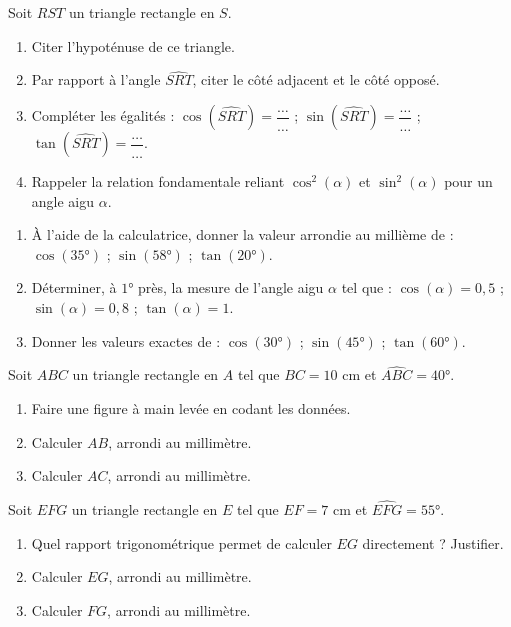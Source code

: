 \documentclass[11pt]{article}
\newcounter{popsec}
\newcounter{popsub}
\newcommand{\courssub}[1]{%
  \stepcounter{popsub}%
  \par\vspace{9pt}\noindent{\popxbold\fontsize{11.5}{13}\selectfont\color{popink}{\color{poporange}\thepopsec.\thepopsub}\hspace{6pt}#1}\par\nopagebreak\vspace{4pt}
}
\begin{document}
\begin{exercice}
Soit $RST$ un triangle rectangle en $S$.
\begin{enumerate}
\item Citer l'hypoténuse de ce triangle.
\item Par rapport à l'angle $\widehat{SRT}$, citer le côté adjacent et le côté opposé.
\item Compléter les égalités : $\cos(\widehat{SRT}) = \dfrac{\ldots}{\ldots}$ ; $\sin(\widehat{SRT}) = \dfrac{\ldots}{\ldots}$ ; $\tan(\widehat{SRT}) = \dfrac{\ldots}{\ldots}$.
\item Rappeler la relation fondamentale reliant $\cos^2(\alpha)$ et $\sin^2(\alpha)$ pour un angle aigu $\alpha$.
\end{enumerate}
\end{exercice}

\begin{exercice}
\begin{enumerate}
\item À l'aide de la calculatrice, donner la valeur arrondie au millième de : $\cos(35°)$ ; $\sin(58°)$ ; $\tan(20°)$.
\item Déterminer, à $1°$ près, la mesure de l'angle aigu $\alpha$ tel que : $\cos(\alpha) = 0,5$ ; $\sin(\alpha) = 0,8$ ; $\tan(\alpha) = 1$.
\item Donner les valeurs exactes de : $\cos(30°)$ ; $\sin(45°)$ ; $\tan(60°)$.
\end{enumerate}
\end{exercice}

\courssub{Je m'entraîne}

\begin{exercice}
Soit $ABC$ un triangle rectangle en $A$ tel que $BC = 10$ cm et $\widehat{ABC} = 40°$.
\begin{enumerate}
\item Faire une figure à main levée en codant les données.
\item Calculer $AB$, arrondi au millimètre.
\item Calculer $AC$, arrondi au millimètre.
\end{enumerate}
\end{exercice}

\begin{exercice}
Soit $EFG$ un triangle rectangle en $E$ tel que $EF = 7$ cm et $\widehat{EFG} = 55°$.
\begin{enumerate}
\item Quel rapport trigonométrique permet de calculer $EG$ directement ? Justifier.
\item Calculer $EG$, arrondi au millimètre.
\item Calculer $FG$, arrondi au millimètre.
\end{enumerate}
\end{exercice}
\end{document}
